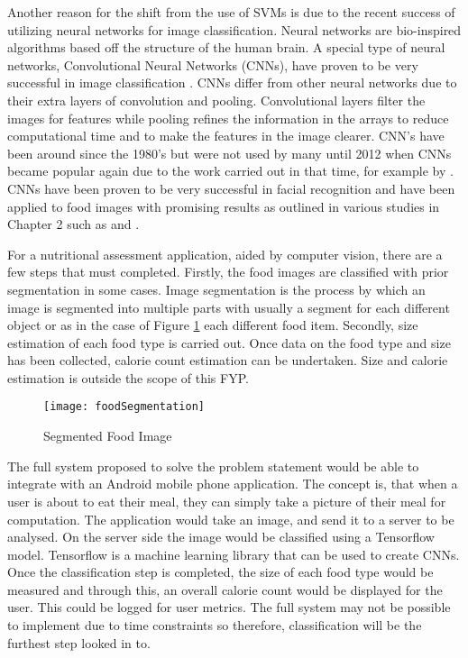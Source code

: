 Another reason for the shift from the use of SVMs is due to the recent success of utilizing neural networks for image classification.
Neural networks are bio-inspired algorithms based off the structure of the human brain.
A special type of neural networks, Convolutional Neural Networks (CNNs), have proven to be very successful in image classification \parencite{krizhevsky2012imagenet}.
CNNs differ from other neural networks due to their extra layers of convolution and pooling.
Convolutional layers filter the images for features while pooling refines the information in the arrays to reduce computational time and to make the features in the image clearer.
CNN's have been around since the 1980's \parencite{handsOnML} but were not used by many until 2012 when CNNs became popular again due to the work carried out in that time, for example by \parencite{krizhevsky2012imagenet}.
CNNs have been proven to be very successful in facial recognition and have been applied to food images with promising results as outlined in various studies in Chapter 2 such as \parencite{yanaiFood} and \parencite{deepLearning}.

For a nutritional assessment application, aided by computer vision, there are a
few steps that must completed. Firstly, the food images are classified with prior segmentation in some cases.
Image segmentation is the process by which an image is segmented into multiple parts with usually a segment for each different object or as in the case of Figure \ref{fig:foodSegment} each different food item.
Secondly, size estimation of each food type is carried out. Once data on the food type and size has been collected, calorie count estimation can be undertaken. Size and calorie estimation is outside the scope of this FYP.

\begin{figure}[h]
  \centering
  \texttt{[image: foodSegmentation]}
  \caption{Segmented Food Image \parencite{segmentFood}}
  \label{fig:foodSegment}
\end{figure}


The full system proposed to solve the problem statement would be able to integrate with an Android mobile phone application.
The concept is, that when a user is about to eat their meal, they can simply take a picture of their meal for computation.
The application would take an image, and send it to a server to be analysed.
On the server side the image would be classified using a Tensorflow model.
Tensorflow is a machine learning library that can be used to create CNNs.
Once the classification step is completed, the size of each food type would be measured and through this, an overall calorie count would be displayed for the user.
This could be logged for user metrics.
The full system may not be possible to implement due to time constraints so therefore, classification will be the furthest step looked in to.

